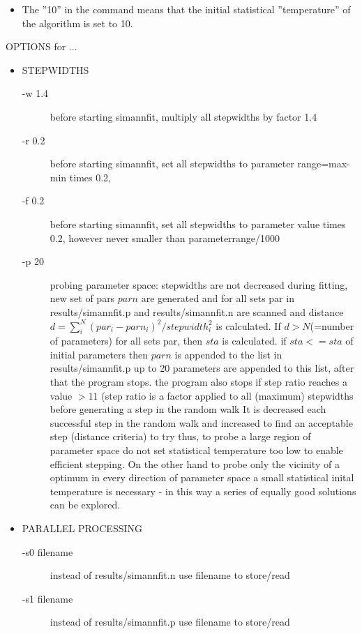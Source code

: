 \begin{itemize}
\item
The ''10'' in the command means that the initial statistical
''temperature'' of the algorithm
is set to 10.  
\end{itemize}

 OPTIONS for ...
\begin{itemize}
\item STEPWIDTHS
\begin{description}
\item[-w 1.4]  before starting simannfit, multiply all stepwidths by factor 1.4 
\item[-r 0.2] before starting simannfit, set all stepwidths to parameter 
            range=max-min times 0.2, 
\item[-f 0.2] before starting simannfit, set all stepwidths to parameter value 
            times 0.2, however never smaller than parameterrange/1000 
\item[-p 20] probing parameter space: stepwidths are not decreased during
	    fitting, new set of pars $parn$ are generated and for all sets par in 
	    {\prg results/simannfit.p} and {\prg results/simannfit.n} are scanned and
	    distance $d=\sum_i^N (par_i-parn_i)^2/stepwidth_i^2$ is calculated. If
$d>N $(=number of parameters)
	    for all sets par, then $sta$ is calculated. if  $sta<=sta$ of initial parameters
	    then $parn$ is appended to the list in {\prg results/simannfit.p}
	    up to 20 parameters are appended to this list, after that the program stops.
	    the program also stops if step ratio reaches a value $> 11$ (step ratio 
	    is a factor applied to all (maximum) stepwidths before generating a step in the random walk
	    It is decreased each successful step in the random walk and increased to find an
	    acceptable step (distance criteria) to try
	    thus, to probe a large region of parameter space do not set statistical
	    temperature too low to enable efficient stepping. On the other hand to
	    probe only the vicinity of a optimum in every direction of parameter
	    space a small statistical inital temperature is necessary
	    - in this way a series of equally good solutions can be explored.
\end{description}
\item  PARALLEL PROCESSING
\begin{description}\item[-s0 filename] instead of results/simannfit.n use filename to store/read 
\item[-s1 filename] instead of results/simannfit.p use filename to store/read 

\end{description}
\end{itemize}
